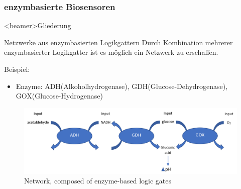 \documentclass{beamer}
\begin{document}
    \subsubsection{enzymbasierte Biosensoren}
    
    \begin{frame}<beamer>{Gliederung}
	\end{frame}
    
    \begin{frame}{Netzwerke aus enzymbasierten Logikgattern}
    	Durch Kombination mehrerer enzymbasierter Logikgatter ist es m{\"o}glich ein Netzwerk zu erschaffen.
    	
    	Beispiel: 
    	\begin{itemize}
    		\item Enzyme: ADH(Alkoholhydrogenase), GDH(Glucose-Dehydrogenase), GOX(Glucose-Hydrogenase)
    	\end{itemize}
    	\begin{figure}
    		\centering \scriptsize \includegraphics[scale= 0.30]{pics/network1.png}
    	\caption{Network, composed of enzyme-based logic gates} 
   		\end{figure}
   		
   	
    
	\end{frame}
\end{document}
